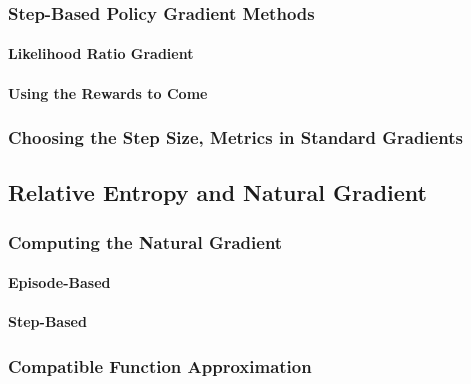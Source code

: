 			\subsubsection{Step-Based Policy Gradient Methods} %

				\paragraph{Likelihood Ratio Gradient} %

				\paragraph{Using the Rewards to Come} %

			\subsubsection{Choosing the Step Size, Metrics in Standard Gradients} %

		\subsection{Relative Entropy and Natural Gradient} %

			\subsubsection{Computing the Natural Gradient} %

				\paragraph{Episode-Based} %

				\paragraph{Step-Based} %

			\subsubsection{Compatible Function Approximation} %


